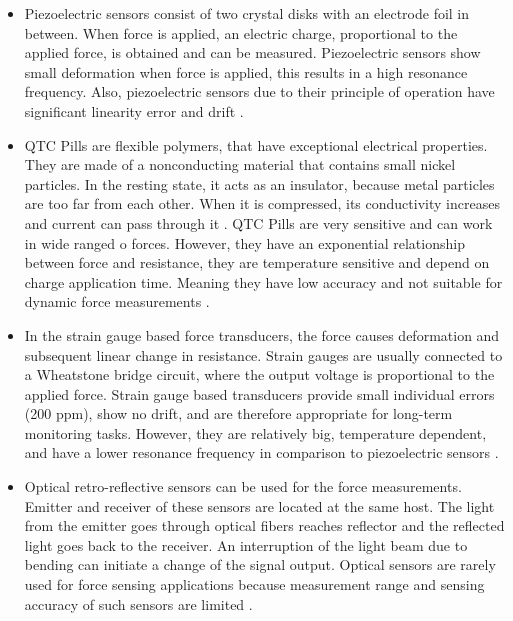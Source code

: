 \begin{itemize}
\item Piezoelectric sensors consist of two crystal disks with an electrode foil in between. When force is applied, an electric charge, proportional to the applied force, is obtained and can be measured. Piezoelectric sensors show small deformation when force is applied, this results in a high resonance frequency. Also, piezoelectric sensors due to their principle of operation have significant linearity error and drift \cite{SGandP2}.

\item QTC Pills are flexible polymers, that have exceptional electrical properties. They are made of a nonconducting material that contains small nickel particles.  In the resting state, it acts as an insulator, because metal particles are too far from each other. When it is compressed, its conductivity increases and current can pass through it \cite{azaman_characteristic_2016}. QTC Pills are very sensitive and can work in wide ranged o forces. However, they have an exponential relationship between force and resistance, they are temperature sensitive and depend on charge application time. Meaning they have low accuracy and not suitable for dynamic force measurements \cite{_quantum_2010}.

\item In the strain gauge based force transducers, the force causes deformation and subsequent linear change in resistance. Strain gauges are usually connected to a Wheatstone bridge circuit, where the output voltage is proportional to the applied force. Strain gauge based transducers provide small individual errors (200 ppm), show no drift, and are therefore appropriate for long-term monitoring tasks. However, they are relatively big, temperature dependent, and have a lower resonance frequency in comparison to piezoelectric sensors \cite{SGandP1,SGandP2}.

\item Optical retro-reflective sensors can be used for the force measurements. Emitter and receiver of these sensors are located at the same host. The light from the emitter goes through optical fibers reaches reflector and the reflected light goes back to the receiver. An interruption of the light beam due to bending can initiate a change of the signal output. Optical sensors are rarely used for force sensing applications because measurement range and sensing accuracy of such sensors are limited \cite{su_fiber_optic_2017}.
\end{itemize}

